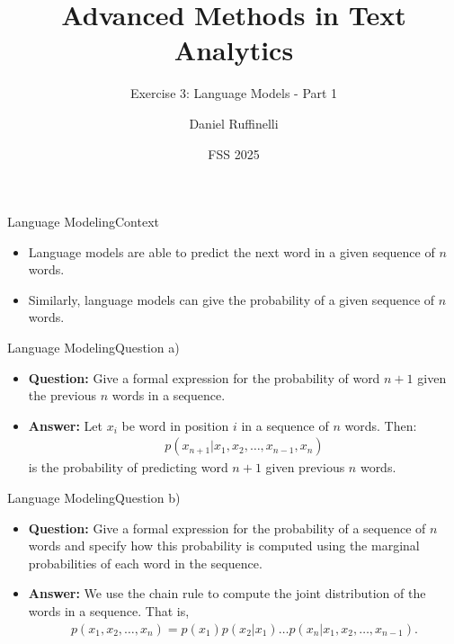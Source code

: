 \documentclass[t]{beamer}
\title[Write your short title here]{Advanced Methods in Text Analytics}
\subtitle{Exercise 3: Language Models - Part 1}
\author{Daniel Ruffinelli}
\institute{University of Mannheim}
\date{FSS 2025}
\begin{document}

\begin{frame}
    \titlepage{}
\end{frame}

\begin{frame}{Language Modeling}{Context}
    \begin{itemize}
        \item Language models are able to predict the next word in a given
              sequence of $n$ words.
        \item Similarly, language models can give the probability of a given
              sequence of $n$ words.
    \end{itemize}
\end{frame}

\begin{frame}{Language Modeling}{Question a)}
    \begin{itemize}
        \item \textbf{Question:} Give a formal expression for the probability of
              word $n+1$ given the previous $n$ words in a sequence.
              \pause
        \item \textbf{Answer:} Let $x_i$ be word in position $i$ in a sequence
              of $n$ words. Then:
              \begin{align*}
                  p(x_{n+1}|x_1, x_2, \ldots, x_{n-1}, x_{n})
              \end{align*}
              is the probability of predicting word $n+1$ given previous $n$
              words.
    \end{itemize}
\end{frame}

\begin{frame}{Language Modeling}{Question b)}
    \begin{itemize}
        \item \textbf{Question:} Give a formal expression for the probability of
              a sequence of $n$ words and specify how this probability is
              computed using the marginal probabilities of each word in the
              sequence.
              \pause
        \item \textbf{Answer:} We use the chain rule to compute the joint
              distribution of the words in a sequence.
              That is,
              \begin{align*}
                  p(x_1, x_2, \ldots, x_n) = p(x_1)p(x_2|x_1)\ldots p(x_n|x_1,x_2,\ldots,x_{n-1}).
              \end{align*}
    \end{itemize}
\end{frame}
\end{document}
